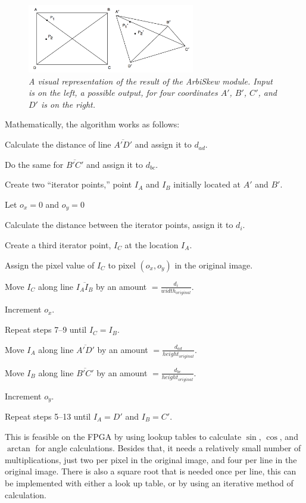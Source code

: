 \documentclass[10pt]{article}
\begin{document}
\begin{figure}[h!]
\centering
\includegraphics[width=0.65\textwidth]{arbiskew_graphic.png}
\caption{\emph{A visual representation of the result of the ArbiSkew module. Input is on the left, a possible output, for four coordinates $A\prime$, $B\prime$, $C\prime$, and $D\prime$ is on the right.}}
\end{figure}

Mathematically, the algorithm works as follows:
\begin{enumerate*}
\item Calculate the distance of line $\overline{A\prime D\prime}$ and assign it to $d_{ad}$.
\item Do the same for $\overline{B\prime C\prime}$ and assign it to $d_{bc}$.
\item Create two ``iterator points,'' point $I_A$ and $I_B$ initially located at $A\prime$ and $B\prime$.
\item Let $o_x = 0$ and $o_y = 0$
\item Calculate the distance between the iterator points, assign it to $d_i$.
\item Create a third iterator point, $I_C$ at the location $I_A$.
\item Assign the pixel value of $I_C$ to pixel $(o_x, o_y)$ in the original image.
\item Move $I_C$ along line $\overline{I_A I_B}$ by an amount $= \frac{d_i}{width_{original}}$.
\item Increment $o_x$.
\item Repeat steps 7--9 until $I_C = I_B$.
\item Move $I_A$ along line $\overline{A\prime D\prime}$ by an amount $= \frac{d_{ad}}{height_{original}}$.
\item Move $I_B$ along line $\overline{B\prime C\prime}$ by an amount $= \frac{d_{bc}}{height_{original}}$.
\item Increment $o_y$.
\item Repeat steps 5--13 until $I_A = D\prime$ and $I_B = C\prime$.
\end{enumerate*}

This is feasible on the FPGA by using lookup tables to calculate $\sin$, $\cos$, and $\arctan$ for angle calculations. Besides that, it needs a relatively small number of multiplications, just two per pixel in the original image, and four per line in the original image. There is also a square root that is needed once per line, this can be implemented with either a look up table, or by using an iterative method of calculation.
\end{document}
